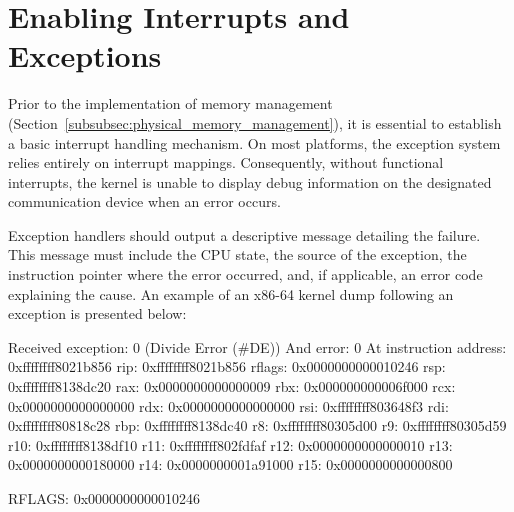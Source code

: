 \documentclass[a4paper,10pt,twoside]{report}
\theoremstyle{definition}
\begin{document}


\section{Enabling Interrupts and Exceptions}
\label{subsec:os-tutorial-interrupts}

Prior to the implementation of memory management (Section~\ref{subsubsec:physical_memory_management}), it is essential to establish a basic interrupt handling mechanism. On most platforms, the exception system relies entirely on interrupt mappings. Consequently, without functional interrupts, the kernel is unable to display debug information on the designated communication device when an error occurs.

Exception handlers should output a descriptive message detailing the failure. This message must include the CPU state, the source of the exception, the instruction pointer where the error occurred, and, if applicable, an error code explaining the cause. An example of an x86-64 kernel dump following an exception is presented below:

\begin{cppcode} Received exception: 0 (Divide Error (#DE))
    And error: 0
    At instruction address: 0xffffffff8021b856
    rip:                    0xffffffff8021b856
    rflags:                 0x0000000000010246
    rsp:                    0xffffffff8138dc20
    rax:                    0x0000000000000009
    rbx:                    0x000000000006f000
    rcx:                    0x0000000000000000
    rdx:                    0x0000000000000000
    rsi:                    0xffffffff803648f3
    rdi:                    0xffffffff80818c28
    rbp:                    0xffffffff8138dc40
    r8:                     0xffffffff80305d00
    r9:                     0xffffffff80305d59
    r10:                    0xffffffff8138df10
    r11:                    0xffffffff802fdfaf
    r12:                    0x0000000000000010
    r13:                    0x0000000000180000
    r14:                    0x0000000001a91000
    r15:                    0x0000000000000800
    
    RFLAGS:                 0x0000000000010246
\end{cppcode}
\end{document}
